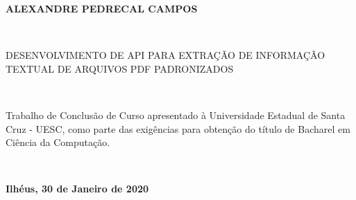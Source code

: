 
%
% 
%
\begin{folhadeaprovacao}


\begin{center}

    {\large \begin{large} \bfseries ALEXANDRE PEDRECAL CAMPOS \end{large}\\}
    \vspace{4cm}
    {\large\bfseries{\begin{large} DESENVOLVIMENTO DE API PARA EXTRAÇÃO DE INFORMAÇÃO TEXTUAL DE ARQUIVOS PDF PADRONIZADOS \end{large}}\\}
    \vspace{1cm}
    \hspace{.45\linewidth}
    \begin{minipage}{.50\linewidth}

            Trabalho de Conclusão de Curso apresentado à Universidade Estadual de Santa Cruz - UESC, como parte das exigências para obtenção do título de Bacharel em Ciência da Computação.
    \end{minipage}
    \\
\end{center}
    \textbf{Ilhéus, 30 de Janeiro de 2020}
\begin{center}


    \bfseries{}
\end{center}

    \vspace{2.5cm}
    \vspace{3 cm}%

\end{folhadeaprovacao}
